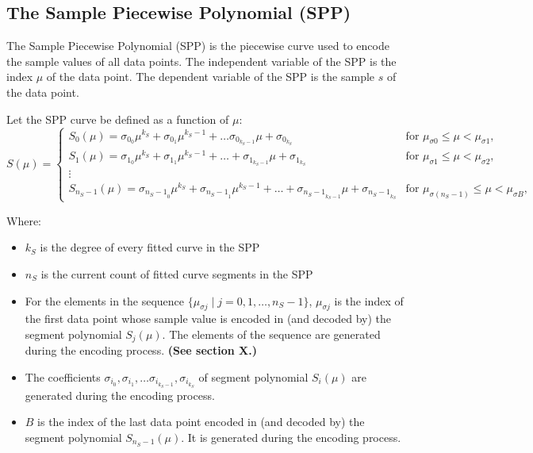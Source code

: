 \documentclass{article}
\begin{document}
\subsection{The Sample Piecewise Polynomial (SPP)}
The Sample Piecewise Polynomial (SPP) is the piecewise curve used to encode the sample values of all data points. The independent variable of the SPP is the index \(\mu\) of the data point. The dependent variable of the SPP is the sample \(s\) of the data point.

Let the SPP curve be defined as a function of $\mu$:
\begin{equation*} %
    \label{eq:S(\mu)}
S(\mu) = \begin{cases}
S_0(\mu) = \sigma_{0_{0}}\mu^{k_S} + \sigma_{0_{1}}\mu^{k_S-1} + \ldots \sigma_{0_{k_S-1}}\mu + \sigma_{0_{k_S}} & \text{for } \mu_{\sigma 0} \leq \mu < \mu_{\sigma 1}, \\
S_1(\mu) = \sigma_{1_{0}}\mu^{k_S} + \sigma_{1_{1}}\mu^{k_S-1} + \ldots + \sigma_{1_{k_S-1}}\mu + \sigma_{1_{k_S}} & \text{for } \mu_{\sigma 1} \leq \mu < \mu_{\sigma 2}, \\
\vdots & \\
S_{n_S-1}(\mu) = \sigma_{{n_S-1}_{0}}\mu^{k_S} + \sigma_{{n_S-1}_{1}}\mu^{k_S-1} + \ldots + \sigma_{{n_S-1}_{k_S-1}}\mu + \sigma_{{n_S-1}_{k_S}} & \text{for } \mu_{\sigma (n_S-1)} \leq \mu < \mu_{\sigma B},
\end{cases}
\end{equation*}

Where:
\begin{itemize}
    \item \(k_S\) is the degree of every fitted curve in the SPP
    \item \(n_S\) is the current count of fitted curve segments in the SPP
    \item For the elements in the sequence $\{\mu_{\sigma j} \mid j = 0, 1, \ldots, n_S-1\}$, $\mu_{\sigma j}$ is the index of the first data point whose sample value is encoded in (and decoded by) the segment polynomial $S_j(\mu)$. The elements of the sequence are generated during the encoding process. \textbf{(See section X.)}
    \item The coefficients \(\sigma_{i_{0}}, \sigma_{i_{1}}, \ldots \sigma_{{i}_{k_S-1}}, \sigma_{{i}_{k_S}}\) of segment polynomial $S_i(\mu)$ are generated during the encoding process.
    \item \(B\) is the index of the last data point encoded in (and decoded by) the segment polynomial $S_{n_S-1}(\mu)$. It is generated during the encoding process.
\end{itemize}
\end{document}

